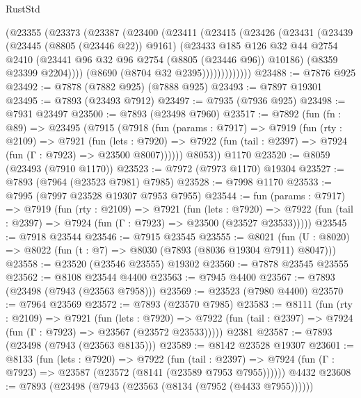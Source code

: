 \begin{lexlean}{RustStd}
\begin{coremodule}
            (@23355
              (@23373
                (@23387
                  (@23400
                    (@23411
                      (@23415
                        (@23426
                          (@23431
                            (@23439
                              (@23445 (@8805 (@23446 @22)) @9161)
                              (@23433
                                @185
                                @126
                                @32
                                @44
                                @2754
                                @2410
                                (@23441 @96 @32 @96 @2754 (@8805 (@23446 @96)) @10186)
                                (@8359 @23399 @2204))))
                          (@8690 (@8704 @32 @2395)))))))))))))
@23488 := @7876 @925
@23492 := @7878 (@7882 @925) (@7888 @925)
@23493 := @7897 @19301
@23495 := @7893 (@23493 @7912)
@23497 := @7935 (@7936 @925)
@23498 := @7931 @23497
@23500 := @7893 (@23498 @7960)
@23517 := @7892
    (fun (fn : @89) =>
    @23495
      (@7915
        (@7918
          (fun (params : @7917) =>
          @7919
            (fun (rty : @2109) =>
            @7921
              (fun (lets : @7920) =>
              @7922 (fun (tail : @2397) => @7924 (fun (Γ : @7923) => @23500 @8007))))))
        @8053))
    @1170
@23520 := @8059 (@23493 (@7910 @1170))
@23523 := @7972 (@7973 @1170) @19304
@23527 := @7893 (@7964 (@23523 @7981) @7985)
@23528 := @7998 @1170
@23533 := @7995 (@7997 @23528 @19307 @7953 @7955)
@23544 := fun (params : @7917) =>
  @7919
    (fun (rty : @2109) =>
    @7921
      (fun (lets : @7920) =>
      @7922 (fun (tail : @2397) => @7924 (fun (Γ : @7923) => @23500 (@23527 @23533)))))
@23545 := @7918 @23544
@23546 := @7915 @23545
@23555 := @8021
    (fun (U : @8020) => @8022 (fun (t : @7) => @8030 (@7893 (@8036 @19304 @7911) @8047)))
@23558 := @23520 (@23546 @23555) @19302
@23560 := @7878 @23545 @23555
@23562 := @8108 @23544 @4400
@23563 := @7945 @4400
@23567 := @7893 (@23498 (@7943 (@23563 @7958)))
@23569 := @23523 (@7980 @4400)
@23570 := @7964 @23569
@23572 := @7893 (@23570 @7985)
@23583 := @8111
    (fun (rty : @2109) =>
    @7921
      (fun (lets : @7920) =>
      @7922 (fun (tail : @2397) => @7924 (fun (Γ : @7923) => @23567 (@23572 @23533)))))
    @2381
@23587 := @7893 (@23498 (@7943 (@23563 @8135)))
@23589 := @8142 @23528 @19307
@23601 := @8133
    (fun (lets : @7920) =>
    @7922
      (fun (tail : @2397) =>
      @7924 (fun (Γ : @7923) => @23587 (@23572 (@8141 (@23589 @7953 @7955))))))
    @4432
@23608 := @7893 (@23498 (@7943 (@23563 (@8134 (@7952 (@4433 @7955))))))

\end{coremodule}
\end{lexlean}
